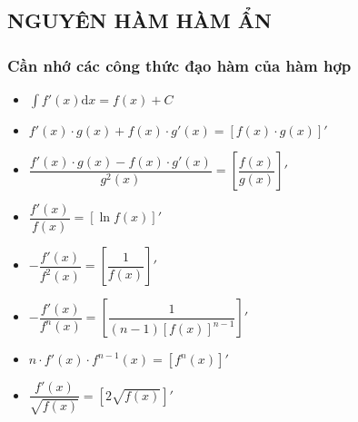 \subsection{NGUYÊN HÀM HÀM ẨN}

\subsubsection*{Cần nhớ các công thức đạo hàm của hàm hợp}
\begin{itemize}[\color{blue}\faPencilSquare]
	\item $\int{f'(x)\mathrm{d}x}=f(x)+C$
	\item $f'(x)\cdot g(x)+f(x)\cdot g'(x)=\left[f(x)\cdot g(x)\right]'$
	\item $\dfrac{f'(x)\cdot g(x)-f(x)\cdot g'(x)}{g^2(x)} =\left[\dfrac{f(x)}{g(x)}\right]'$
	\item $\dfrac{f'(x)}{f(x)}=\left[\ln f(x) \right]'$
	\item $-\dfrac{f'(x)}{f^2(x)}=\left[ \dfrac{1}{f(x)} \right]'$
	\item $-\dfrac{f'(x)}{f^n(x)}=\left[ \dfrac{1}{(n-1)\left[ f(x) \right]^{n-1}} \right]'$
	\item $n\cdot f'(x)\cdot f^{n-1}(x)=\left[ f^n(x) \right]'$
	\item $\dfrac{f'(x)}{\sqrt{f(x)}}=\left[ 2\sqrt{f(x)} \right]'$
\end{itemize}


